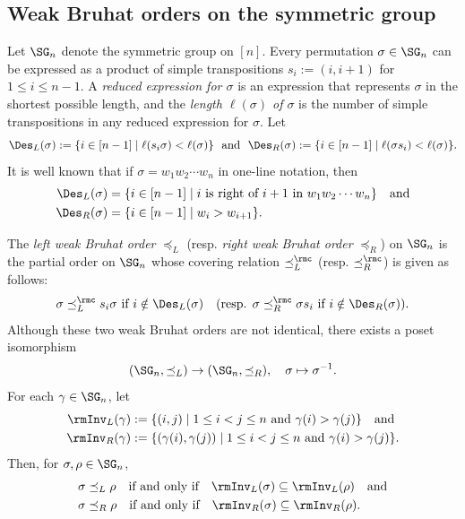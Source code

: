 \documentclass[12pt, reqno]{amsart}
\theoremstyle{definition}
\numberwithin{equation}{section} \numberwithin{figure}{section}
\numberwithin{table}{section}
\begin{document}
\subsection{Weak Bruhat orders on the symmetric group}\label{subsec: Symmetric group}

Let $\SG_n$ denote the symmetric group on $[n]$. Every permutation $\sigma \in \SG_n$ can be expressed as a product of simple transpositions $s_i := (i,i+1)$ for $1 \leq i \leq n-1$.
A \emph{reduced expression for $\sigma$} is an expression that represents $\sigma$ in the shortest possible length, and 
the \emph{length $\ell(\sigma)$ of $\sigma$} is the number of simple transpositions in any reduced expression for $\sigma$.
Let
\[
\Des_L(\sigma):= \{i \in [n-1] \mid \ell(s_i \sigma) < \ell(\sigma)\}
\ \  \text{and} \ \  
\Des_R(\sigma):= \{i \in [n-1] \mid \ell(\sigma s_i) < \ell(\sigma)\}.
\]
It is well known that if $\sigma = w_1 w_2 \cdots w_n$ in one-line notation, then
\begin{align*}\label{eq: Des alternating def}
\begin{aligned}
\Des_L(\sigma) & = \{ i \in [n-1] \mid \text{$i$ is right of $i+1$ in $w_1 w_2 \cdots w_n$} \} \quad \text{and} \\
\Des_R(\sigma) & = \{ i \in [n-1] \mid w_i > w_{i+1}
\}.
\end{aligned} 
\end{align*}

The \emph{left weak Bruhat order} $\preceq_L$ 
(resp. \emph{right weak Bruhat order} $\preceq_R$) on $\SG_n$
is the partial order on $\SG_n$ whose covering relation $\preceq_L^{\rmc}$ (resp. $\preceq_R^\rmc$) is given as follows: 
\[
\sigma \preceq_L^\rmc s_i \sigma \text{ if }i \notin \Des_L(\sigma)
\quad \text{(resp. $\sigma \preceq_R^\rmc \sigma s_i$ if  $i \notin \Des_R(\sigma)$).}
\]
Although these two weak Bruhat orders are not identical,  
there exists a poset isomorphism $$(\SG_n, \preceq_L)\to (\SG_n, \preceq_R),\quad \sigma \mapsto \sigma^{-1}.$$
For each $\gamma \in \SG_n$, let
\begin{align*}
\rmInv_L(\gamma) & := \{(i,j) \mid 1 \le i < j \le n \text{ and } \gamma(i) > \gamma(j) \} \quad \text{and} \\
\rmInv_R(\gamma) & :=
\{(\gamma(i), \gamma(j)) \mid 1 \le i < j \le n \text{ and } \gamma(i) > \gamma(j)\}.
\end{align*}
Then, for $\sigma, \rho \in \SG_n$, 
\begin{align*}
& \sigma \preceq_L \rho 
\quad \text{if and only if} \quad
\rmInv_L(\sigma) \subseteq \rmInv_L(\rho) \quad \text{and}\\
& \sigma \preceq_R \rho
\quad \text{if and only if} \quad
\rmInv_R(\sigma) \subseteq \rmInv_R(\rho).
\end{align*}
\end{document}
